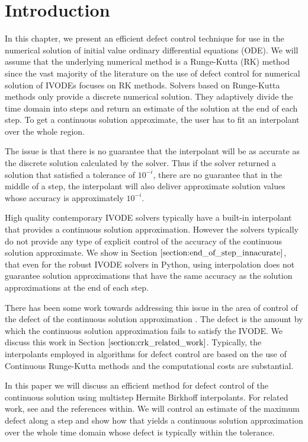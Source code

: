 \section{Introduction}

In this chapter, we present an efficient defect control technique for use in the numerical solution of initial value ordinary differential equations (ODE). We will assume that the underlying numerical method is a Runge-Kutta (RK) method since the vast majority of the literature on the use of defect control for numerical solution of IVODEs focuses on RK methods. Solvers based on Runge-Kutta methods only provide a discrete numerical solution. They adaptively divide the time domain into steps and return an estimate of the solution at the end of each step. To get a continuous solution approximate, the user has to fit an interpolant over the whole region.

The issue is that there is no guarantee that the interpolant will be as accurate as the discrete solution calculated by the solver. Thus if the solver returned a solution that satisfied a tolerance of $10^{-i}$, there are no guarantee that in the middle of a step, the interpolant will also deliver approximate solution values whose accuracy is approximately $10^{-i}$. 

High quality contemporary IVODE solvers typically have a built-in interpolant that provides a continuous solution approximation. However the solvers typically do not provide any type of explicit control of the accuracy of the continuous solution approximate. We show in Section $\ref{section:end_of_step_innacurate}$, that even for the robust IVODE solvers in Python, using interpolation does not guarantee solution approximations that have the same accuracy as the solution approximations at the end of each step. 


There has been some work towards addressing this issue in the area of control of the defect of the continuous solution approximation \cites{MR2600928}{MR1950917}{MR1803189}{MR1239829}{MR997658}{MR996053}. The defect is the amount by which the continuous solution approximation fails to satisfy the IVODE. We discuss this work in Section $\ref{section:crk_related_work}$. Typically, the interpolants employed in algorithms for defect control are based on the use of Continuous Runge-Kutta methods and the computational costs are substantial. 

In this paper we will discuss an efficient method for defect control of the continuous solution using multistep Hermite Birkhoff interpolants. For related work, see \cites{MR1239829}{tsitouras1990runge}{papageorgiou1997continuous} and the references within. We will control an estimate of the maximum defect along a step and show how that yields a continuous solution approximation over the whole time domain whose defect is typically within the tolerance.

